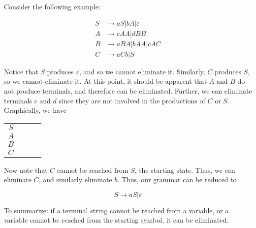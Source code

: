 Consider the following example:\@

\begin{align*}
    S &\to aS|bA|\varepsilon \\
    A &\to cAA|dBB\\
    B &\to aBA|bAA|cAC\\
    C &\to aCb|S
\end{align*}

Notice that \(S\) produces \(\varepsilon \), and so we cannot eliminate it. Similarly, \(C\) produces \(S\), so we cannot eliminate it. At this point, it should be apparent that \(A\) and \(B\) do not produce terminals, and therefore can be eliminated. Further, we can eliminate terminals \(c\) and \(d\) since they are not involved in the productions of \(C\) or \(S\). Graphically, we have

\begin{tabular}{c c c c}
    \(S\) & & & \\
    \(A\) & & & \\
    \(B\) & & & \\
    \(C\) & & &
\end{tabular}

Now note that \(C\) cannot be reached from \(S\), the starting state. Thus, we can eliminate \(C\), and similarly eliminate \(b\). Thus, our grammar can be reduced to 

\[S \to aS|\varepsilon \]

To summarize: if a terminal string cannot be reached from a variable, or a variable cannot be reached from the starting symbol, it can be eliminated.